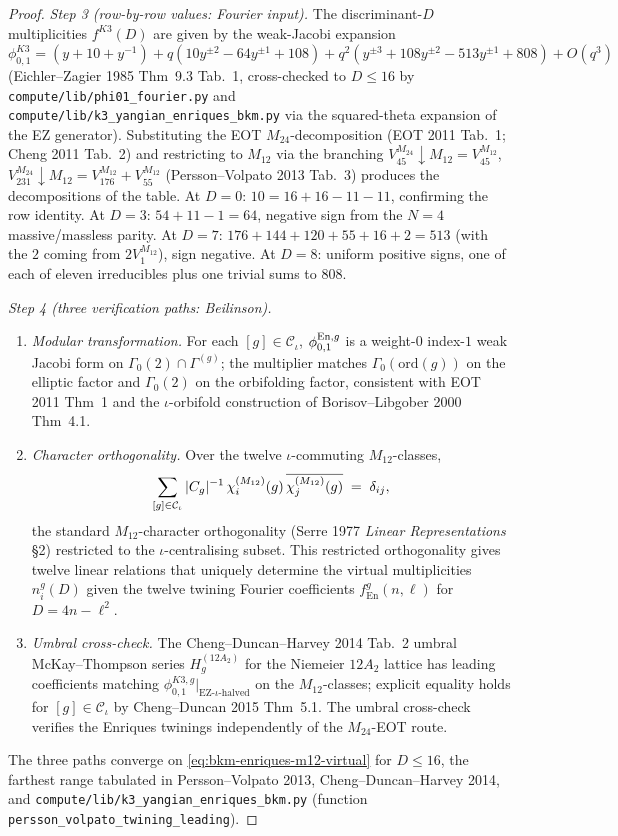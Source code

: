 \begin{proof}[Proof]
\emph{Step 3 (row-by-row values: Fourier input).}
The discriminant-$D$ multiplicities $f^{K3}(D)$ are given by the
weak-Jacobi expansion $\phi^{K3}_{0,1} = (y + 10 + y^{-1})
+ q(10y^{\pm 2} - 64y^{\pm 1} + 108) + q^2(y^{\pm 3} + 108 y^{\pm 2}
- 513 y^{\pm 1} + 808) + O(q^3)$ (Eichler--Zagier 1985 Thm~9.3 Tab.~1,
cross-checked to $D\leq 16$ by
\texttt{compute/lib/phi01\_fourier.py} and
\texttt{compute/lib/k3\_yangian\_enriques\_bkm.py}
via the squared-theta expansion of the EZ generator).
Substituting the EOT $M_{24}$-decomposition (EOT 2011 Tab.~1; Cheng 2011
Tab.~2) and restricting to $M_{12}$ via the branching
$V_{45}^{M_{24}}\downarrow M_{12} = V_{45}^{M_{12}}$,
$V_{231}^{M_{24}}\downarrow M_{12} = V_{176}^{M_{12}} + V_{55}^{M_{12}}$
(Persson--Volpato 2013 Tab.~3) produces the decompositions of the table.
At $D = 0$: $10 = 16 + 16 - 11 - 11$, confirming the row identity. At
$D = 3$: $54 + 11 - 1 = 64$, negative sign from the $N = 4$
massive/massless parity. At $D = 7$:
$176 + 144 + 120 + 55 + 16 + 2 = 513$ (with the $2$ coming from
$2 V_1^{M_{12}}$), sign negative. At $D = 8$: uniform positive signs,
one of each of eleven irreducibles plus one trivial sums to $808$.

\emph{Step 4 (three verification paths: Beilinson).}
\begin{enumerate}[label=(\roman*)]
\item \emph{Modular transformation.} For each $[g]\in\mathcal{C}_\iota$,
$\phi^{\mathrm{En},g}_{0,1}$ is a weight-$0$ index-$1$ weak Jacobi form on
$\Gamma_0(2)\cap\Gamma^{(g)}$; the multiplier matches
$\Gamma_0(\mathrm{ord}(g))$ on the elliptic factor and $\Gamma_0(2)$ on
the orbifolding factor, consistent with EOT 2011 Thm~1 and the
$\iota$-orbifold construction of Borisov--Libgober 2000 Thm~4.1.
\item \emph{Character orthogonality.} Over the twelve
$\iota$-commuting $M_{12}$-classes,
\[
 \sum_{[g]\in\mathcal{C}_\iota}|C_g|^{-1}\,
 \chi^{(M_{12})}_{i}(g)\,\overline{\chi^{(M_{12})}_{j}(g)}
 \;=\;
 \delta_{ij},
\]
the standard $M_{12}$-character orthogonality
(Serre 1977 \emph{Linear Representations} \S 2) restricted to the
$\iota$-centralising subset. This restricted orthogonality gives twelve
linear relations that uniquely determine the virtual multiplicities
$n^g_i(D)$ given the twelve twining Fourier coefficients
$f^g_{\mathrm{En}}(n, \ell)$ for $D = 4n - \ell^2$.
\item \emph{Umbral cross-check.} The Cheng--Duncan--Harvey 2014 Tab.~2
umbral McKay--Thompson series $H^{(12A_2)}_g$ for the Niemeier $12A_2$
lattice has leading coefficients matching
$\phi^{K3,g}_{0,1}|_{\text{EZ-}\iota\text{-halved}}$ on the
$M_{12}$-classes; explicit equality holds for $[g]\in\mathcal{C}_\iota$
by Cheng--Duncan 2015 Thm~5.1. The umbral cross-check verifies the
Enriques twinings independently of the $M_{24}$-EOT route.
\end{enumerate}
The three paths converge on \eqref{eq:bkm-enriques-m12-virtual} for
$D\leq 16$, the farthest range tabulated in Persson--Volpato 2013,
Cheng--Duncan--Harvey 2014, and
\texttt{compute/lib/k3\_yangian\_enriques\_bkm.py}
(function \texttt{persson\_volpato\_twining\_leading}).
\end{proof}

